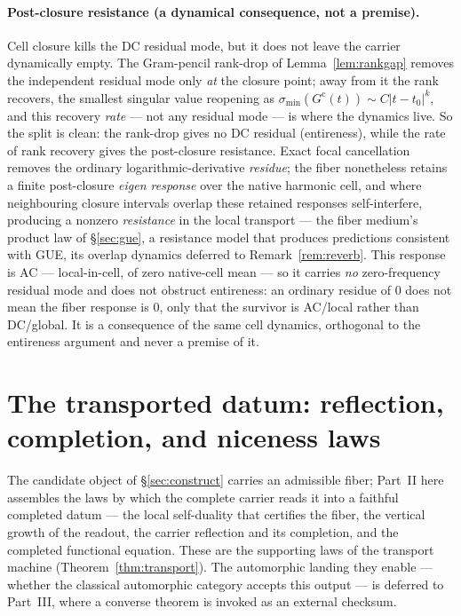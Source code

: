 \documentclass[11pt]{article}
\theoremstyle{definition}
\begin{document}
\paragraph{Post-closure resistance (a dynamical consequence, not a premise).} Cell closure kills the DC
residual mode, but it does not leave the carrier dynamically empty. The Gram-pencil rank-drop of
Lemma~\ref{lem:rankgap} removes the independent residual mode only \emph{at} the closure point; away from it
the rank recovers, the smallest singular value reopening as $\sigma_{\min}(G^{\mathrm c}(t))\sim C|t-t_0|^{k}$,
and this recovery \emph{rate} --- not any residual mode --- is where the dynamics live. So the split is clean:
the rank-drop gives no DC residual (entireness), while the rate of rank recovery gives the post-closure
resistance. Exact focal cancellation removes the ordinary logarithmic-derivative \emph{residue}; the fiber
nonetheless retains a finite post-closure \emph{eigen response} over the native harmonic cell, and where
neighbouring closure intervals overlap these retained responses self-interfere, producing a nonzero
\emph{resistance} in the local transport --- the
fiber medium's product law of \S\ref{sec:gue}, a resistance model that produces predictions consistent with
GUE, its overlap dynamics deferred to Remark~\ref{rem:reverb}. This response is AC --- local-in-cell, of
zero native-cell mean --- so it carries
\emph{no} zero-frequency residual mode and does not obstruct entireness: an ordinary residue of $0$ does not
mean the fiber response is $0$, only that the survivor is AC/local rather than DC/global. It is a
consequence of the same cell dynamics, orthogonal to the entireness argument and never a premise of it.

\section{The transported datum: reflection, completion, and niceness laws}\label{sec:converse}

The candidate object of \S\ref{sec:construct} carries an admissible fiber; Part~II here assembles the laws by
which the complete carrier reads it into a faithful completed datum --- the local self-duality that certifies
the fiber, the vertical growth of the readout, the carrier reflection and its completion, and the completed
functional equation. These are the supporting laws of the transport machine (Theorem~\ref{thm:transport}).
The automorphic landing they enable --- whether the classical automorphic category accepts this output --- is
deferred to Part~III, where a converse theorem is invoked as an external checksum.
\end{document}
